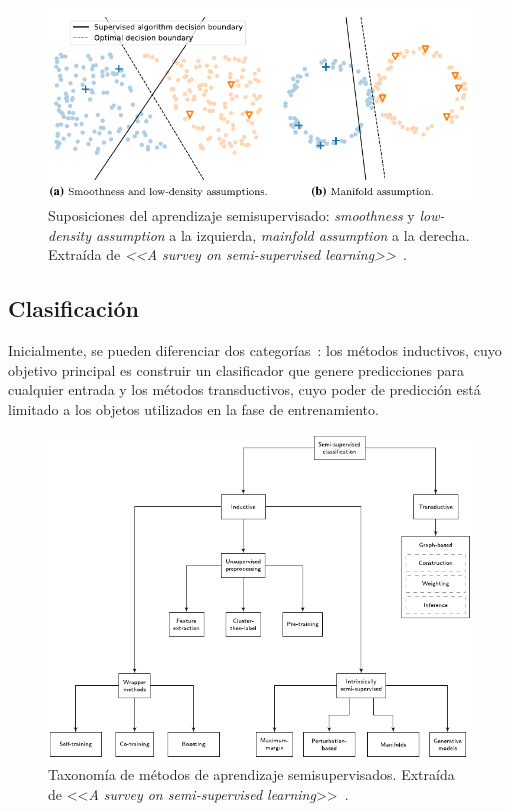 \begin{figure}[h]
	\caption[Aprendizaje semisupervisado: suposiciones]{Suposiciones del aprendizaje semisupervisado: \textit{smoothness} y \textit{low-density assumption} a la izquierda, \textit{mainfold assumption} a la derecha. Extraída de \textit{<<A survey on semi-supervised learning>>}~\cite{engelen2020surveyOnSemiSupervised}.}
	\label{img:assumptions}
	\centering
	\includegraphics[width=\textwidth]{../img/memoria/3_assumptions.pdf}
\end{figure}


\subsection{Clasificación}

Inicialmente, se pueden diferenciar dos categorías~\cite{engelen2020surveyOnSemiSupervised}: los métodos inductivos, cuyo objetivo principal es construir un clasificador que genere predicciones para cualquier entrada y los métodos transductivos, cuyo poder de predicción está limitado a los objetos utilizados en la fase de entrenamiento.


\begin{figure}[h]
\caption[Aprendizaje semisupervisado: taxonomía de métodos]{Taxonomía de métodos de aprendizaje semisupervisados. Extraída de <<\textit{A survey on semi-supervised learning}>>~\cite{engelen2020surveyOnSemiSupervised}.}
\centering
\includegraphics[width=\textwidth]{../img/memoria/3_hoos_taxonomy.pdf}
\end{figure}

